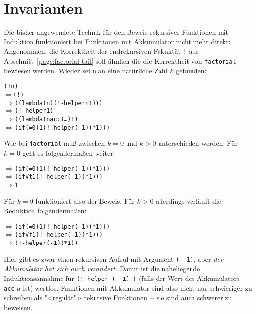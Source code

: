 

\section{Invarianten}
\label{sec:invarianten}

Die bisher angewendete Technik für den Beweis rekursiver Funktionen
mit Induktion funktioniert bei Funktionen mit Akkumulator nicht mehr
direkt: Angenommen, die Korrektheit der endrekursiven Fakuktät
\texttt{!} aus Abschnitt~\ref{page:factorial-tail} soll ähnlich die
die Korrektheit von \texttt{factorial} bewiesen werden.  Wieder sei
\texttt{n} an eine natürliche Zahl $k$ gebunden:
%
\begin{alltt}
(! n)
\(=\) (! )
\(\Longrightarrow\) ((lambda (n) (!-helper n 1)) )
\(\Longrightarrow\) (!-helper  1)
\(\Longrightarrow\) ((lambda (n acc) \ldots)  1)
\(\Longrightarrow\) (if (=  0) 1 (!-helper (-  1) (* 1 )))
\end{alltt}
%
Wie bei \texttt{factorial} muß zwischen $k=0$ und $k>0$ unterschieden
werden.  Für $k=0$ geht es folgendermaßen weiter:
%
\begin{alltt}
\(\Longrightarrow\) (if (=  0) 1 (!-helper (-  1) (* 1 )))
\(\Longrightarrow\) (if #t 1 (!-helper (-  1) (* 1 )))
\(\Longrightarrow\) 1
\end{alltt}
%
Für $k=0$ funktioniert also der Beweis.  Für $k>0$ allerdings verläuft
die Reduktion folgendermaßen:
%
\begin{alltt}
\(\Longrightarrow\) (if (=  0) 1 (!-helper (-  1) (* 1 )))
\(\Longrightarrow\) (if #f 1 (!-helper (-  1) (* 1 )))
\(\Longrightarrow\) (!-helper (-  1) (* 1 ))
\end{alltt}
%
Hier gibt es zwar einen rekursiven Aufruf mit Argument \texttt{(-
   1)}, aber \emph{der Akkumulator hat sich auch verändert.}
Damit ist die naheliegende Induktionsannahme für \texttt{(!-helper (-
   1) )} (falls der Wert des Akkumulators
\texttt{acc} $a$ ist) wertlos.  Funktionen mit Akkumulator sind also
nicht nur schwieriger zu schreiben als "<regulär"> rekursive
Funktionen~-- sie sind auch schwerer zu beweisen.

